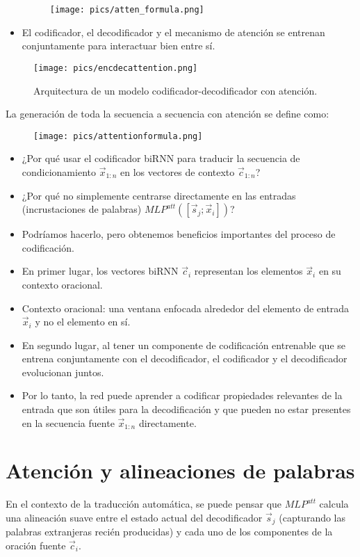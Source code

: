 \begin{itemize}
\begin{figure}[h]
  \centering
  \texttt{[image: pics/atten\_formula.png]}
\end{figure}

\item El codificador, el decodificador y el mecanismo de atención se entrenan conjuntamente para interactuar bien entre sí.
\end{itemize}

\begin{figure}[h]
  \centering
  \texttt{[image: pics/encdecattention.png]}
  \caption{Arquitectura de un modelo codificador-decodificador con atención.}
\end{figure}

La generación de toda la secuencia a secuencia con atención se define como:

\begin{figure}[h]
  \centering
  \texttt{[image: pics/attentionformula.png]}
\end{figure}

\begin{itemize}
\item ¿Por qué usar el codificador biRNN para traducir la secuencia de condicionamiento $\vec{x}_{1:n}$ en los vectores de contexto $\vec{c}_{1:n}$?
\item ¿Por qué no simplemente centrarse directamente en las entradas (incrustaciones de palabras) $MLP^{att}([\vec{s}_j;\vec{x}_i])$?
\item Podríamos hacerlo, pero obtenemos beneficios importantes del proceso de codificación.
\item En primer lugar, los vectores biRNN $\vec{c}_i$ representan los elementos $\vec{x}_i$ en su contexto oracional.
\item Contexto oracional: una ventana enfocada alrededor del elemento de entrada $\vec{x}_i$ y no el elemento en sí.
\item En segundo lugar, al tener un componente de codificación entrenable que se entrena conjuntamente con el decodificador, el codificador y el decodificador evolucionan juntos.
\item Por lo tanto, la red puede aprender a codificar propiedades relevantes de la entrada que son útiles para la decodificación y que pueden no estar presentes en la secuencia fuente $\vec{x}_{1:n}$ directamente.
\end{itemize}



\section{Atención y alineaciones de palabras}
En el contexto de la traducción automática, se puede pensar que $MLP^{att}$ calcula una alineación suave entre el estado actual del decodificador $\vec{s}_j$ (capturando las palabras extranjeras recién producidas) y cada uno de los componentes de la oración fuente $\vec{c}_i$.

